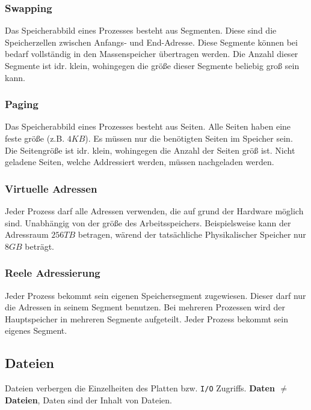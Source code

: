 \subsubsection{Swapping}

Das Speicherabbild eines Prozesses besteht aus Segmenten. Diese sind die Speicherzellen zwischen Anfangs- und End-Adresse. Diese Segmente können bei bedarf vollständig in den Massenspeicher übertragen werden. Die Anzahl dieser Segmente ist idr. klein, wohingegen die größe dieser Segmente beliebig groß sein kann.

\subsubsection{Paging}

Das Speicherabbild eines Prozesses besteht aus Seiten. Alle Seiten haben eine feste größe (z.B. $4KB$). Es müssen nur die benötigten Seiten im Speicher sein. Die Seitengröße ist idr. klein, wohingegen die Anzahl der Seiten größ ist. Nicht geladene Seiten, welche Addressiert werden, müssen nachgeladen werden.

\subsubsection{Virtuelle Adressen}

Jeder Prozess darf alle Adressen verwenden, die auf grund der Hardware möglich sind. Unabhängig von der größe des Arbeitsspeichers. Beispielsweise kann der Adressraum $256TB$ betragen, wärend der tatsächliche Physikalischer Speicher nur $8GB$ beträgt.

\subsubsection{Reele Adressierung}

Jeder Prozess bekommt sein eigenen Speichersegment zugewiesen. Dieser darf nur die Adressen in seinem Segment benutzen. Bei mehreren Prozessen wird der Hauptspeicher in mehreren Segmente aufgeteilt. Jeder Prozess bekommt sein eigenes Segment. 

\subsection{Dateien}

Dateien verbergen die Einzelheiten des Platten bzw. \texttt{I/O} Zugriffs. \textbf{Daten $\neq$ Dateien}, Daten sind der Inhalt von Dateien.

